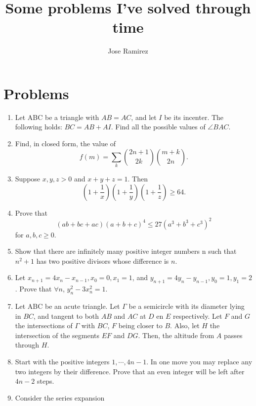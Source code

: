 \documentclass{article}
\title{Some problems I've solved through time}
\author{Jose Ramirez}
\begin{document}
\maketitle

\section{Problems}
\label{sec:Problems}

\begin{enumerate}

\item Let ABC be a triangle with $AB=AC$, and let $I$  be its incenter. The following holds: $BC=AB+AI$. Find all the possible values of $\angle BAC$.

\item Find, in closed form, the value of $$f(m) = \sum_{k} \binom{2n + 1}{2k}\binom{m + k}{2n}.$$

\item Suppose $x, y, z > 0$ and $x + y + z = 1$. Then $$\left(1 + \frac{1}{x}\right)\left(1 + \frac{1}{y}\right)\left(1 + \frac{1}{z}\right) \geq 64.$$

\item Prove that $$(ab + bc + ac)(a + b + c)^4 \leq 27(a^3 + b^3 + c^3)^{2}$$ for $a, b, c \geq 0.$

\item Show that there are infinitely many positive integer numbers n such that $n^2 + 1$ has two positive divisors whose difference is $n$.

\item Let $x_{n + 1} = 4x_{n} - x_{n - 1}, x_0 = 0, x_1 = 1$, and $y_{n + 1} = 4y_{n} - y_{n - 1}, y_0 = 1, y_1 = 2$. Prove that $\forall n$, $y_{n}^2 - 3x_{n}^2 = 1$.

\item Let ABC be an acute triangle. Let $\Gamma$ be a semicircle with its diameter lying in $BC$, and tangent to both $AB$ and $AC$ at $D$ en $E$ respectively. Let $F$ and $G$ the intersections of $\Gamma$ with $BC$, $F$ being closer to $B$. Also, let $H$ the intersection of the segments $EF$ and $DG$. Then, the altitude from $A$ passes through $H$.

\item Start with the positive integers $1, \cdots, 4n - 1$. In one move you may replace any two integers by their difference. Prove that an even integer will be left after $4n - 2$ steps.

\item Consider the series expansion


\end{enumerate}
\end{document}
